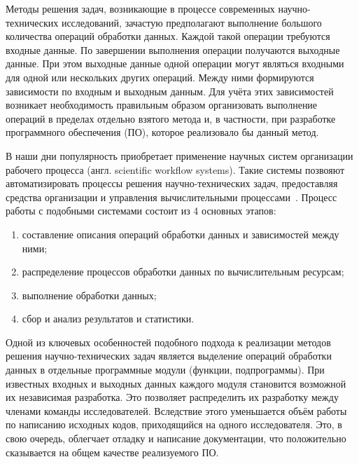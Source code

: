 \def\notedate{2022.04.13}
\def\currentauthor{Тришин И.В. (РК6-81Б)}
Методы решения задач, возникающие в процессе современных научно-технических исследований, зачастую предполагают выполнение большого количества операций обработки данных. Каждой такой операции требуются входные данные. По завершении выполнения операции получаются выходные данные. При этом выходные данные одной операции могут являться входными для одной или нескольких других операций. Между ними формируются зависимости по входным и выходным данным. Для учёта этих зависимостей возникает необходимость правильным образом организовать выполнение операций в пределах отдельно взятого метода и, в частности, при разработке программного обеспечения (ПО), которое реализовало бы данный метод. 

В наши дни популярность приобретает применение научных систем организации рабочего процесса (англ. scientific workflow systems). Такие системы позвояют автоматизировать процессы решения научно-технических задач, предоставляя средства организации и управления вычислительными процессами~\cite{DeelmanWorkflow2009}. Процесс работы с подобными системами состоит из 4 основных этапов:
\begin{enumerate}
    \item составление описания операций обработки данных и зависимостей между ними;
    \item распределение процессов обработки данных по вычислительным ресурсам;
    \item выполнение обработки данных;
    \item сбор и анализ результатов и статистики.
\end{enumerate}

Одной из ключевых особенностей подобного подхода к реализации методов решения научно-технических задач является выделение операций обработки данных в отдельные программные модули (функции, подпрограммы). При известных входных и выходных данных каждого модуля становится возможной их независимая разработка\cite{DanilovPar2011}. Это позволяет распределить их разработку между членами команды исследователей. Вследствие этого уменьшается объём работы по написанию исходных кодов, приходящийся на одного исследователя. Это, в свою очередь, облегчает отладку и написание документации, что положительно сказывается на общем качестве реализуемого ПО.

\noteattributes{}

